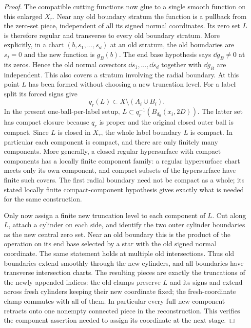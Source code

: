 \begin{proof}
The compatible cutting functions now glue to a single smooth function
on this enlarged $X_r$.  Near any old boundary stratum the function is a
pullback from the zero-set piece, independent of all its signed normal
coordinates.  Its zero set $L$ is therefore regular and transverse
to every old boundary stratum.  More explicitly, in a chart
$(b,s_1,\ldots,s_d)$ at an old stratum, the old boundaries are $s_j=0$
and the new function is $g_B(b)$.  The end base hypothesis says
$\dd g_B\ne0$ at its zeros.  Hence the old normal covectors
$\dd s_1,\ldots,\dd s_d$ together with $\dd g_B$ are independent.
This also covers a stratum involving the radial boundary.  At this point
$L$ has been formed without choosing a new truncation level.  For a label split its forced signs give
\[
 q_r(L)\subset X\setminus(A_i\cup B_i).
\]
In the present one-ball-per-label setup,
$L\subset q_r^{-1}(B_{d_0}(x_i,2D))$.  The latter set has compact
closure because $q_r$ is proper and the original closed outer ball
is compact.  Since $L$ is closed in $X_r$, the whole label boundary $L$
is compact.  In particular each component is compact, and there are
only finitely many components.  More generally, a closed regular
hypersurface with compact components has a locally finite component
family: a regular hypersurface chart meets only its own component,
and compact subsets of the hypersurface have finite such covers.
The first radial boundary need not be compact as a whole; its stated
locally finite compact-component hypothesis gives exactly what is
needed for the same construction.

Only now assign a finite new truncation level to each component of $L$.
Cut along $L$, attach a cylinder on each side, and identify the two
outer cylinder boundaries as the new central zero set.  Near an old
boundary this is the product of the operation on its end base selected by a star with the
old signed normal coordinate.  The same statement holds at multiple
old intersections.  Thus old boundaries extend smoothly through the new
cylinders, and all boundaries have transverse intersection charts.
The resulting pieces are exactly the truncations of the newly
appended indices: the old clamps preserve $L$ and its signs and
extend across fresh cylinders keeping their new coordinate fixed;
the fresh-coordinate clamp commutes with all of them.  In particular
every full new component retracts onto one nonempty connected piece
in the reconstruction.  This verifies the component assertion
needed to assign its coordinate at the next stage.


\end{proof}
